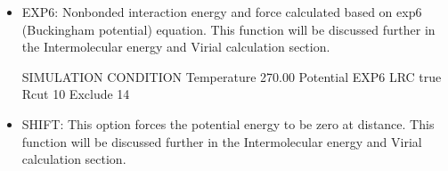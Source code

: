 \documentclass[letterpaper,10pt,english]{sphinxmanual}
\begin{document}
\begin{description}
\begin{itemize}
\begin{itemize}
\begin{sphinxVerbatim}[commandchars=\\\{\}]
\PYGZsh{}\PYGZsh{}\PYGZsh{}\PYGZsh{}\PYGZsh{}\PYGZsh{}\PYGZsh{}\PYGZsh{}\PYGZsh{}\PYGZsh{}\PYGZsh{}\PYGZsh{}\PYGZsh{}\PYGZsh{}\PYGZsh{}\PYGZsh{}\PYGZsh{}\PYGZsh{}\PYGZsh{}\PYGZsh{}\PYGZsh{}\PYGZsh{}\PYGZsh{}\PYGZsh{}\PYGZsh{}\PYGZsh{}\PYGZsh{}\PYGZsh{}\PYGZsh{}\PYGZsh{}\PYGZsh{}\PYGZsh{}\PYGZsh{}
\PYGZsh{} SIMULATION CONDITION
\PYGZsh{}\PYGZsh{}\PYGZsh{}\PYGZsh{}\PYGZsh{}\PYGZsh{}\PYGZsh{}\PYGZsh{}\PYGZsh{}\PYGZsh{}\PYGZsh{}\PYGZsh{}\PYGZsh{}\PYGZsh{}\PYGZsh{}\PYGZsh{}\PYGZsh{}\PYGZsh{}\PYGZsh{}\PYGZsh{}\PYGZsh{}\PYGZsh{}\PYGZsh{}\PYGZsh{}\PYGZsh{}\PYGZsh{}\PYGZsh{}\PYGZsh{}\PYGZsh{}\PYGZsh{}\PYGZsh{}\PYGZsh{}\PYGZsh{}
Temperature   270.00
Potential     VDW
LRC           true
Rcut          10
Exclude       1\PYGZhy{}4
\end{sphinxVerbatim}

\item {} 
EXP6: Nonbonded interaction energy and force calculated based on exp\sphinxhyphen{}6 (Buckingham potential) equation. This function will be discussed further in the Intermolecular energy and Virial calculation section.

\begin{sphinxVerbatim}[commandchars=\\\{\}]
\PYGZsh{}\PYGZsh{}\PYGZsh{}\PYGZsh{}\PYGZsh{}\PYGZsh{}\PYGZsh{}\PYGZsh{}\PYGZsh{}\PYGZsh{}\PYGZsh{}\PYGZsh{}\PYGZsh{}\PYGZsh{}\PYGZsh{}\PYGZsh{}\PYGZsh{}\PYGZsh{}\PYGZsh{}\PYGZsh{}\PYGZsh{}\PYGZsh{}\PYGZsh{}\PYGZsh{}\PYGZsh{}\PYGZsh{}\PYGZsh{}\PYGZsh{}\PYGZsh{}\PYGZsh{}\PYGZsh{}\PYGZsh{}\PYGZsh{}
\PYGZsh{} SIMULATION CONDITION
\PYGZsh{}\PYGZsh{}\PYGZsh{}\PYGZsh{}\PYGZsh{}\PYGZsh{}\PYGZsh{}\PYGZsh{}\PYGZsh{}\PYGZsh{}\PYGZsh{}\PYGZsh{}\PYGZsh{}\PYGZsh{}\PYGZsh{}\PYGZsh{}\PYGZsh{}\PYGZsh{}\PYGZsh{}\PYGZsh{}\PYGZsh{}\PYGZsh{}\PYGZsh{}\PYGZsh{}\PYGZsh{}\PYGZsh{}\PYGZsh{}\PYGZsh{}\PYGZsh{}\PYGZsh{}\PYGZsh{}\PYGZsh{}\PYGZsh{}
Temperature   270.00
Potential     EXP6
LRC           true
Rcut          10
Exclude       1\PYGZhy{}4
\end{sphinxVerbatim}

\item {} 
SHIFT: This option forces the potential energy to be zero at  distance. This function will be discussed further in the Intermolecular energy and Virial calculation section.


\end{itemize}
\end{itemize}
\end{description}
\end{document}
